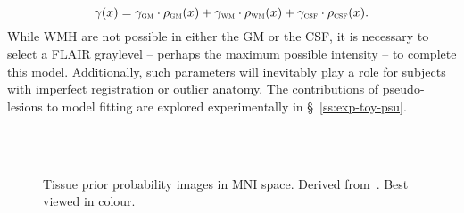\begin{equation}
  \gamma(x) = \gamma_{\textsc{gm}{}}\cdot\rho_{\textsc{gm}{}}(x)
            + \gamma_{\textsc{wm}{}}\cdot\rho_{\textsc{wm}{}}(x)
            + \gamma_{\textsc{csf}{}}\cdot\rho_{\textsc{csf}{}}(x).
\end{equation}
While WMH are not possible in either the GM or the CSF,
it is necessary to select a FLAIR graylevel
-- perhaps the maximum possible intensity --
to complete this model.
Additionally, such parameters will inevitably play a role
for subjects with imperfect registration or outlier anatomy.
The contributions of pseudo-lesions to model fitting
are explored experimentally in \S~\ref{ss:exp-toy-psu}.
\begin{figure}
  \centering
  \\[0.5em]
  \\[0.5em]
  \caption{Tissue prior probability images in MNI space.
    Derived from~\cite{Mazziotta2001}. Best viewed in colour.}%
  \label{fig:tpm-3}
\end{figure}
